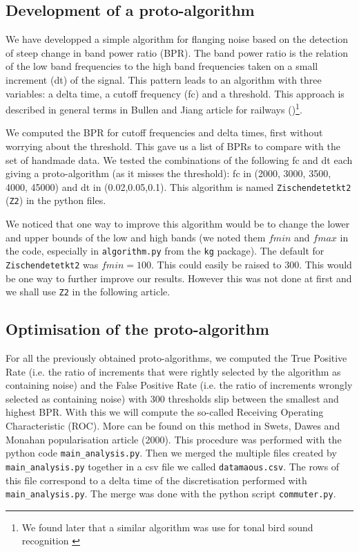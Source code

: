 \documentclass{article}\usepackage[]{graphicx}\usepackage[]{color}
\begin{document}
\subsection{Development of a proto-algorithm} We have developped a simple algorithm for flanging noise based on the detection of steep change in band power ratio (BPR). The band power ratio is the relation of the low band frequencies to the high band frequencies taken on a small increment (dt) of the signal. This pattern leads to an algorithm with three variables: a delta time, a cutoff frequency (fc) and a threshold. This approach is described in general terms in Bullen and Jiang article for railways (\citeyear{Bullen2010})\footnote{We found later that a similar algorithm was use for tonal bird sound recognition \autocite{Jancovic2011}}.

We computed the BPR for cutoff frequencies and delta times, first without worrying about the threshold. This gave us a list of BPRs to compare with the set of handmade data. We tested the combinations of the following fc and dt each giving a proto-algorithm (as it misses the threshold): fc in (2000, 3000, 3500, 4000, 45000) and dt in (0.02,0.05,0.1). This algorithm is named {\tt Zischendetetkt2} ({\tt Z2}) in the python files.

We noticed that one way to improve this algorithm would be to change the lower and upper bounds of the low and high bands (we noted them $fmin$ and $fmax$ in the code, especially in {\tt algorithm.py} from the {\tt kg} package). The default for {\tt Zischendetetkt2} was $fmin=100$. This could easily be raised to $300$. This would be one way to further improve our results. However this was not done at first and we shall use {\tt Z2} in the following article.

\subsection{Optimisation of the proto-algorithm} For all the previously obtained proto-algorithms, we computed the True Positive Rate (i.e. the ratio of increments that were rightly selected by the algorithm as containing noise) and the False Positive Rate (i.e. the ratio of increments wrongly selected as containing noise) with 300 thresholds slip between the smallest and highest BPR. With this we will compute the so-called Receiving Operating Characteristic (ROC). More can be found on this method in Swets, Dawes and Monahan popularisation article (2000). This procedure was performed with the python code {\tt main{\_}analysis.py}. Then we merged the multiple files created by {\tt main{\_}analysis.py} together in a csv file we called {\tt datamaous.csv}. The rows of this file correspond to a delta time of the discretisation performed with {\tt main{\_}analysis.py}. The merge was done with the python script {\tt commuter.py}.
\end{document}
